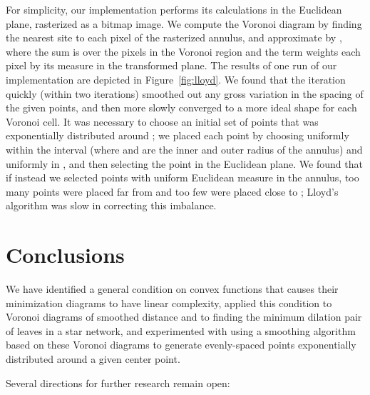 \documentclass[10pt, conference, compsocconf]{IEEEtran}
\begin{document}
For simplicity, our implementation performs its calculations in the Euclidean plane, rasterized as a bitmap image. We compute the Voronoi diagram by finding the nearest site to each pixel of the rasterized annulus, and approximate  by , where the sum is over the pixels in the Voronoi region  and the  term weights each pixel by its measure in the transformed plane. The results of one run of our implementation are depicted in Figure~\ref{fig:lloyd}. We found that the iteration quickly (within two iterations) smoothed out any gross variation in the spacing of the given points, and then more slowly converged to a more ideal shape for each Voronoi cell. It was necessary to choose an initial set of points that was exponentially distributed around ; we placed each point by choosing  uniformly within the interval  (where  and  are the inner and outer radius of the annulus) and  uniformly in , and then selecting the point   in the Euclidean plane. We found that if instead we selected points with uniform Euclidean measure in the annulus, too many points were placed far from  and too few were placed close to ; Lloyd's algorithm was slow in correcting this imbalance.

\section{Conclusions}

We have identified a general condition on convex functions that causes their minimization diagrams to have linear complexity, applied this condition to Voronoi diagrams of smoothed distance and to finding the minimum dilation pair of leaves in a star network, and experimented with using a smoothing algorithm based on these Voronoi diagrams to generate evenly-spaced points exponentially distributed around a given center point.

Several directions for further research remain open:
\end{document}
